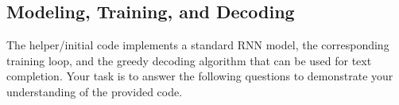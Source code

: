 \documentclass[a4paper,11pt]{article}
\begin{document}
 
% 
% 
% 
 
\subsection{Modeling, Training, and Decoding}

The helper/initial code implements a standard RNN model, the corresponding training loop, and the greedy decoding algorithm that can be used for text completion.
Your task is to answer the following questions to demonstrate your understanding of the provided code.


\end{document}
